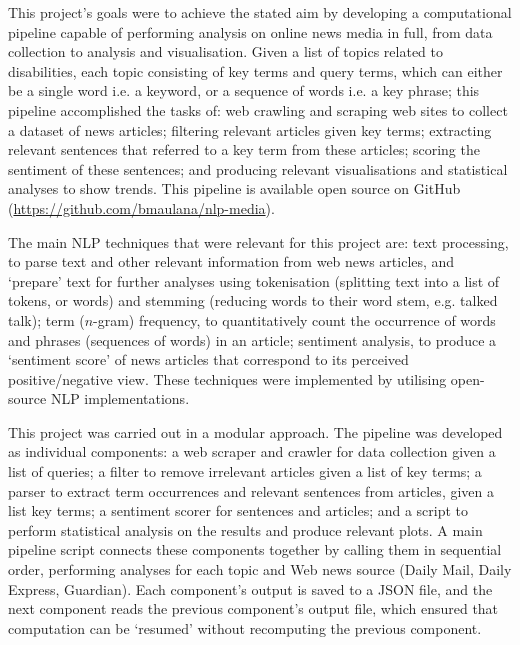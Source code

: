 \documentclass{report}
\begin{document}
This project's goals were to achieve the stated aim by developing a computational pipeline capable of performing analysis on online news media in full, from data collection to analysis and visualisation.
Given a list of topics related to disabilities, each topic consisting of key terms and query terms, which can either be a single word i.e. a keyword, or a sequence of words i.e. a key phrase;
this pipeline accomplished the tasks of: 
web crawling and scraping web sites to collect a dataset of news articles;
filtering relevant articles given key terms; 
extracting relevant sentences that referred to a key term from these articles;
scoring the sentiment of these sentences;
and producing relevant visualisations and statistical analyses to show trends.
This pipeline is available open source on GitHub (\url{https://github.com/bmaulana/nlp-media}).

The main NLP techniques that were relevant for this project are:
text processing, to parse text and other relevant information from web news articles, and `prepare' text for further analyses using tokenisation (splitting text into a list of tokens, or words) and stemming (reducing words to their word stem, e.g. talked \textrightarrow\space talk);
term ($n$-gram) frequency, to quantitatively count the occurrence of words and phrases (sequences of words) in an article;
sentiment analysis, to produce a `sentiment score' of news articles that correspond to its perceived positive/negative view.
These techniques were implemented by utilising open-source NLP implementations.

This project was carried out in a modular approach. The pipeline was developed as individual components: 
a web scraper and crawler for data collection given a list of queries; 
a filter to remove irrelevant articles given a list of key terms; 
a parser to extract term occurrences and relevant sentences from articles, given a list key terms; 
a sentiment scorer for sentences and articles; 
and a script to perform statistical analysis on the results and produce relevant plots. 
A main pipeline script connects these components together by calling them in sequential order, performing analyses for each topic and Web news source (Daily Mail, Daily Express, Guardian).
Each component's output is saved to a JSON \cite{rfc8259} file, and the next component reads the previous component's output file, which ensured that computation can be `resumed' without recomputing the previous component. %
\end{document}

